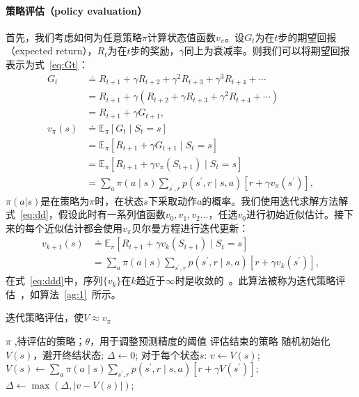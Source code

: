 \paragraph{策略评估（policy evaluation）}
首先，我们考虑如何为任意策略$\pi$计算状态值函数$v_{\pi}$。设$G_{t}$为在$t$步的期望回报（expected return），$R_{t}$为在$t$步的奖励，$\gamma$同上为衰减率。则我们可以将期望回报表示为式~\eqref{eq:Gt}：
  \begin{align}
  G_{t} & \doteq R_{t+1}+\gamma R_{t+2}+\gamma^{2} R_{t+3}+\gamma^{3} R_{t+4}+\cdots \nonumber\\
  &=R_{t+1}+\gamma\left(R_{t+2}+\gamma R_{t+3}+\gamma^{2} R_{t+4}+\cdots\right) \nonumber\\
  &=R_{t+1}+\gamma G_{t+1},\label{eq:Gt}\\
  v_{\pi}(s) & \doteq \mathbb{E}_{\pi}\left[G_{t} \mid S_{t}=s\right] \nonumber\\
  &=\mathbb{E}_{\pi}\left[R_{t+1}+\gamma G_{t+1} \mid S_{t}=s\right] \nonumber\\
  &=\mathbb{E}_{\pi}\left[R_{t+1}+\gamma v_{\pi}\left(S_{t+1}\right) \mid S_{t}=s\right] \nonumber\\
  &=\sum_{a} \pi(a \mid s) \sum_{s^{\prime}, r} p\left(s^{\prime}, r \mid s, a\right)\left[r+\gamma v_{\pi}\left(s^{\prime}\right)\right],
  \label{eq:dd}
  \end{align}
$\pi(a|s)$是在策略为$\pi$时，在状态$s$下采取动作$a$的概率。我们使用迭代求解方法解式~\eqref{eq:dd}，假设此时有一系列值函数$v_{0},v_{1},v_{2}\dots$，任选$v_{0}$进行初始近似估计。接下来的每个近似估计都会使用$v_{\pi}$贝尔曼方程\cite{dixit1990optimization}进行迭代更新：
\begin{equation}
  \begin{aligned}
  v_{k+1}(s) & \doteq \mathbb{E}_{\pi}\left[R_{t+1}+\gamma v_{k}\left(S_{t+1}\right) \mid S_{t}=s\right] \\
  &=\sum_{a} \pi(a \mid s) \sum_{s^{\prime}, r} p\left(s^{\prime}, r \mid s, a\right)\left[r+\gamma v_{k}\left(s^{\prime}\right)\right],
  \end{aligned}
  \label{eq:ddd}
\end{equation}
在式~\eqref{eq:ddd}中，序列$\{v_{k}\}$在$k$趋近于$\infty$时是收敛的~\cite{kamien2013dynamic}。此算法被称为迭代策略评估~\cite{Sutton1998}，如算法~\ref{ag:1}~所示。
\begin{algorithm}[!t]
  \caption{迭代策略评估，使$V\approx v_{\pi} $}
  \begin{algorithmic}[1]
    \Require $\pi$ ,待评估的策略；$\theta$，用于调整预测精度的阈值
    \Ensure 评估结束的策略
    \State 随机初始化$V(s)$，避开终结状态;
    \Repeat
    \State $\Delta\leftarrow 0$;
    \Loop 对于每个状态$s$:
    \State $v \leftarrow V(s)$;
    \State $V(s) \leftarrow \sum_{a} \pi(a \mid s) \sum_{s^{\prime}, r} p\left(s^{\prime}, r \mid s, a\right)\left[r+\gamma V\left(s^{\prime}\right)\right]$;
    \State $\Delta \leftarrow \max (\Delta,|v-V(s)|)$;
    \EndLoop
    \Until{ $\Delta \le \theta$}
  \end{algorithmic}
  \label{ag:1}
\end{algorithm}
